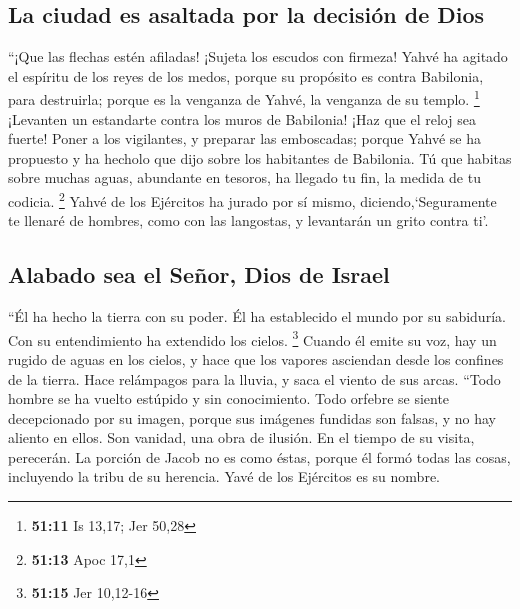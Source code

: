 \begin{paracol}{2}
\hypertarget{la-ciudad-es-asaltada-por-la-decisiuxf3n-de-dios}{%
\subsection{La ciudad es asaltada por la decisión de
Dios}\label{la-ciudad-es-asaltada-por-la-decisiuxf3n-de-dios}}

 ``¡Que las flechas estén afiladas! ¡Sujeta los escudos
con firmeza! Yahvé ha agitado el espíritu de los reyes de los medos,
porque su propósito es contra Babilonia, para destruirla; porque es la
venganza de Yahvé, la venganza de su templo. \footnote{\textbf{51:11} Is
  13,17; Jer 50,28}  ¡Levanten un estandarte contra los
muros de Babilonia! ¡Haz que el reloj sea fuerte! Poner a los
vigilantes, y preparar las emboscadas; porque Yahvé se ha propuesto y ha
hecholo que dijo sobre los habitantes de Babilonia.  Tú
que habitas sobre muchas aguas, abundante en tesoros, ha llegado tu fin,
la medida de tu codicia. \footnote{\textbf{51:13} Apoc 17,1}
 Yahvé de los Ejércitos ha jurado por sí mismo,
diciendo,`Seguramente te llenaré de hombres, como con las langostas, y
levantarán un grito contra ti'.

\hypertarget{alabado-sea-el-seuxf1or-dios-de-israel}{%
\subsection{Alabado sea el Señor, Dios de
Israel}\label{alabado-sea-el-seuxf1or-dios-de-israel}}

 ``Él ha hecho la tierra con su poder. Él ha establecido
el mundo por su sabiduría. Con su entendimiento ha extendido los cielos.
\footnote{\textbf{51:15} Jer 10,12-16}  Cuando él emite
su voz, hay un rugido de aguas en los cielos, y hace que los vapores
asciendan desde los confines de la tierra. Hace relámpagos para la
lluvia, y saca el viento de sus arcas.  ``Todo hombre se
ha vuelto estúpido y sin conocimiento. Todo orfebre se siente
decepcionado por su imagen, porque sus imágenes fundidas son falsas, y
no hay aliento en ellos.  Son vanidad, una obra de
ilusión. En el tiempo de su visita, perecerán.  La
porción de Jacob no es como éstas, porque él formó todas las cosas,
incluyendo la tribu de su herencia. Yavé de los Ejércitos es su nombre.

\hypertarget{martillo-diciendo-el-juicio-de-babilonia-en-su-significado-histuxf3rico-mundial}{%
}
\end{paracol}
